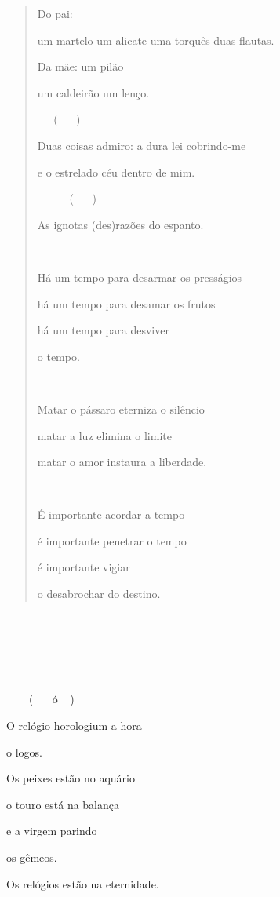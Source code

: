 \begin{quote}
Do pai:

um martelo um alicate uma torquês duas flautas.

Da mãe: um pilão

um caldeirão um lenço.

 ()

Duas coisas admiro: a dura lei cobrindo-me

e o estrelado céu dentro de mim.

  ()

As ignotas (des)razões do espanto.

 

Há um tempo para desarmar os presságios

há um tempo para desamar os frutos

há um tempo para desviver

o tempo.



Matar o pássaro eterniza o silêncio

matar a luz elimina o limite

matar o amor instaura a liberdade.



É importante acordar a tempo

é importante penetrar o tempo

é importante vigiar

o desabrochar do destino.
\end{quote}







  ( ó)

O relógio horologium a hora

o logos.

Os peixes estão no aquário

o touro está na balança

e a virgem parindo

os gêmeos.

Os relógios estão na eternidade.

